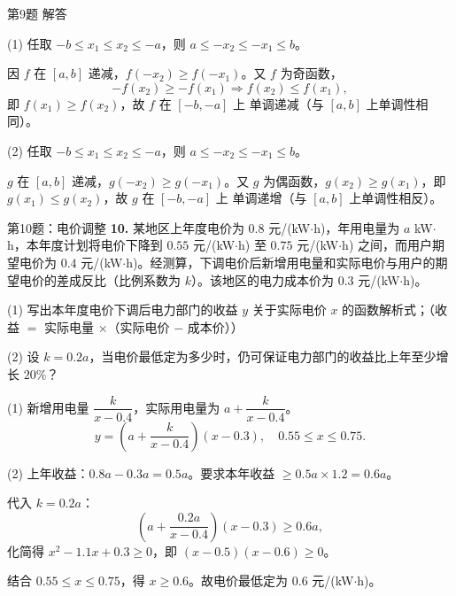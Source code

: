 \documentclass[10pt,aspectratio=169,serif,fleqn]{beamer}
\begin{document}
\begin{frame}[t]{第9题 解答}
\begin{tcolorbox}[colback=orange!10,colframe=orange,title=\textbf{解}]
(1) 任取 $-b\le x_1\le x_2\le-a$，则 $a\le -x_2\le -x_1\le b$。

\vspace{0.3em}
因 $f$ 在 $[a,b]$ 递减，$f(-x_2)\ge f(-x_1)$。又 $f$ 为奇函数，
\[
-f(x_2)\ge-f(x_1)\Rightarrow f(x_2)\le f(x_1),
\]
即 $f(x_1)\ge f(x_2)$，故 $f$ 在 $[-b,-a]$ 上 \alert{单调递减}（与 $[a,b]$ 上单调性相同）。

\vspace{0.8em}
(2) 任取 $-b\le x_1\le x_2\le-a$，则 $a\le -x_2\le -x_1\le b$。

\vspace{0.3em}
$g$ 在 $[a,b]$ 递减，$g(-x_2)\ge g(-x_1)$。又 $g$ 为偶函数，$g(x_2)\ge g(x_1)$，即 $g(x_1)\le g(x_2)$，故 $g$ 在 $[-b,-a]$ 上 \alert{单调递增}（与 $[a,b]$ 上单调性相反）。
\end{tcolorbox}
\end{frame}

\begin{frame}[t]{第10题：电价调整}
\textbf{10.} 某地区上年度电价为 $0.8$ 元/(kW$\cdot$h)，年用电量为 $a$ kW$\cdot$h，本年度计划将电价下降到 $0.55$ 元/(kW$\cdot$h) 至 $0.75$ 元/(kW$\cdot$h) 之间，而用户期望电价为 $0.4$ 元/(kW$\cdot$h)。经测算，下调电价后新增用电量和实际电价与用户的期望电价的差成反比（比例系数为 $k$）。该地区的电力成本价为 $0.3$ 元/(kW$\cdot$h)。

(1) 写出本年度电价下调后电力部门的收益 $y$ 关于实际电价 $x$ 的函数解析式；（收益 $=$ 实际电量 $\times$（实际电价 $-$ 成本价））

(2) 设 $k=0.2a$，当电价最低定为多少时，仍可保证电力部门的收益比上年至少增长 $20\%$？
\end{frame}

\begin{frame}[t]{}\vspace{-1em}
\begin{tcolorbox}[colback=orange!10,colframe=orange,title=\textbf{解}]
(1) 新增用电量 $\dfrac{k}{x-0.4}$，实际用电量为 $a+\dfrac{k}{x-0.4}$。
\[
y=\left(a+\frac{k}{x-0.4}\right)(x-0.3),\quad 0.55\le x\le0.75.
\]

\vspace{0.5em}
(2) 上年收益：$0.8a-0.3a=0.5a$。要求本年收益 $\ge0.5a\times1.2=0.6a$。

\vspace{0.3em}
代入 $k=0.2a$：
\[
\left(a+\frac{0.2a}{x-0.4}\right)(x-0.3)\ge0.6a,
\]
化简得 $x^2-1.1x+0.3\ge0$，即 $(x-0.5)(x-0.6)\ge0$。

\vspace{0.3em}
结合 $0.55\le x\le0.75$，得 $x\ge0.6$。故电价最低定为 \alert{$0.6$ 元/(kW$\cdot$h)}。
\end{tcolorbox}
\end{frame}
\end{document}
